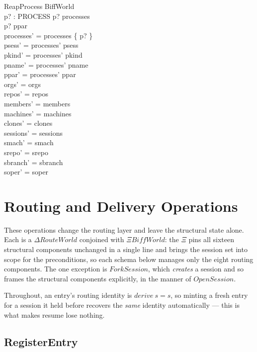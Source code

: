 \documentclass[a4paper,10pt,fleqn]{article}
\begin{document}
\begin{schema}{ReapProcess}
  \Delta BiffWorld \\
  p? : PROCESS
  \where
  p? \in processes \\
  p? \notin \ran ppar \\
  processes' = processes \setminus \{ p? \} \\
  psess' = processes' \dres psess \\
  pkind' = processes' \dres pkind \\
  pname' = processes' \dres pname \\
  ppar' = processes' \dres ppar \\
  orgs' = orgs \\
  repos' = repos \\
  members' = members \\
  machines' = machines \\
  clones' = clones \\
  sessions' = sessions \\
  smach' = smach \\
  srepo' = srepo \\
  sbranch' = sbranch \\
  soper' = soper
\end{schema}

\section{Routing and Delivery Operations}

These operations change the routing layer and leave the structural state
alone.  Each is a $\Delta RouteWorld$ conjoined with $\Xi BiffWorld$:
the $\Xi$ pins all sixteen structural components unchanged in a single
line and brings the session set into scope for the preconditions, so
each schema below manages only the eight routing components.  The one
exception is $ForkSession$, which \emph{creates} a session and so frames
the structural components explicitly, in the manner of $OpenSession$.

Throughout, an entry's routing identity is $derive~s = s$, so
minting a fresh entry for a session it held before recovers the
\emph{same} identity automatically --- this is what makes resume lose
nothing.

\subsection{RegisterEntry}
\end{document}
